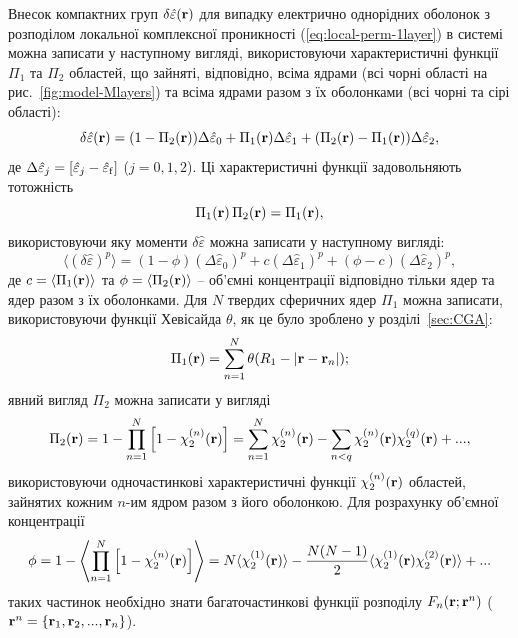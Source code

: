 \documentclass[14pt,twoside]{vakthesis}
\begin{document}
Внесок компактних груп $\delta\hat{\varepsilon}({\bf r})$ для  випадку електрично однорідних оболонок з розподілом  локальної комплексної проникності (\ref{eq:local-perm-1layer}) в системі можна записати у наступному вигляді, використовуючи характеристичні функції $\Pi_1$ та $\Pi_2$ областей, що зайняті, відповідно, всіма ядрами (всі чорні області на рис.~\ref{fig:model-Mlayers}) та всіма ядрами разом з їх оболонками (всі чорні та сірі області):
\begin{equation}\label{eq:delta-eps-1layer}
\delta\hat{\varepsilon} ({\bf r}) = (1 - \Pi_2 ({\bf r})) \Delta\hat{\varepsilon}_0
+ \Pi_1 ({\bf r}) \Delta\hat{\varepsilon}_1
+ (\Pi_2 ({\bf r}) - \Pi_1 ({\bf r})) \Delta\hat{\varepsilon}_2,
\end{equation}
де $\Delta\hat{\varepsilon}_j = [\hat{\varepsilon}_j - 
\hat{\varepsilon}_{\rm f}]$ ($j = 0,1,2$). 
Ці характеристичні функції задовольняють тотожність $$\Pi_1({\bf r})\,\Pi_2({\bf r}) = \Pi_1({\bf r}),$$ використовуючи яку моменти $\delta\hat{\varepsilon}$ можна записати у наступному вигляді:
\begin{equation}\label{eq:moment-1layer}
\langle (\delta\hat{\varepsilon})^p \rangle = (1 - \phi) (\Delta\hat{\varepsilon}_0)^p 
+ c (\Delta\hat{\varepsilon}_1)^p
+ (\phi - c) (\Delta\hat{\varepsilon}_2)^p,
\end{equation}
де $c = \langle \Pi_1({\bf r}) \rangle$ та $\phi = \langle \Pi_2({\bf r}) \rangle$ -- об'ємні концентрації відповідно тільки ядер та ядер разом з їх оболонками. Для $N$ твердих сферичних ядер $\Pi_1$ можна записати, використовуючи функції Хевісайда $\theta$, як це було зроблено у розділі~\ref{sec:CGA}:
\begin{equation}\label{eq:Pi1}
	\Pi_1({\bf r}) = \sum_{n=1}^N \theta(R_1 - |{\bf r} - {\bf r}_n|);
\end{equation}
явний вигляд $\Pi_2$ можна записати у  вигляді~\cite{TorquatoCoreShell, Torquato}
\begin{equation}\label{eq:Pi2}
\Pi_2 ({\bf r}) = 1 - \prod_{n=1}^{N}\left[ 1 - \chi_2^{(n)}({\bf r}) \right] = \sum_{n=1}^{N}\chi_2^{(n)}({\bf r}) - \sum_{n<q}\chi_2^{(n)}({\bf r})\chi_2^{(q)}({\bf r}) + ..., 
\end{equation}
використовуючи одночастинкові характеристичні функції $\chi^{(n)}_2({\bf r})$ областей, зайнятих кожним $n$-им ядром разом з його оболонкою. Для розрахунку об'ємної концентрації 
\begin{equation}\label{eq:phi-full}
\phi = 1 - \left\langle \prod_{n=1}^{N}\left[ 1 - \chi_2^{(n)}({\bf r}) \right] \right\rangle = N \langle \chi_2^{(1)} ({\bf r}) \rangle
- \frac{N(N-1)}{2} \langle \chi_2^{(1)} ({\bf r}) \chi_2^{(2)} ({\bf r}) \rangle + ...
\end{equation}
таких частинок необхідно знати багаточастинкові функції розподілу $F_n({\bf r}; {\bf r}^n)$ (${\bf r}^n = \{{\bf r}_1, {\bf r}_2,..., {\bf r}_n\}$). 
\end{document}
